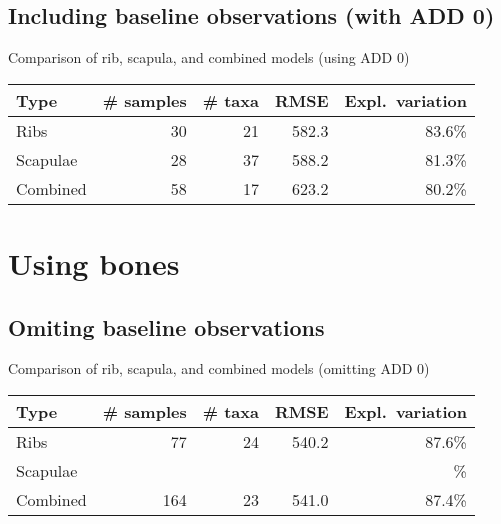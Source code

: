 \documentclass{beamer}
\begin{document}



\subsection{Including baseline observations (with ADD 0)}

\begin{frame}{Comparison of rib, scapula, and combined models (using ADD 0)}

  \begin{tabular}{lrrrr}
    Type & \# samples & \# taxa & RMSE & Expl.\ variation\\ \hline
    Ribs & 30 & 21 & 582.3 & 83.6\% \\
    Scapulae & 28 & 37 & 588.2 & 81.3\% \\
    Combined & 58 & 17 & 623.2 & 80.2\%
  \end{tabular}

\end{frame}








\section{Using bones}


\subsection{Omiting baseline observations}

\begin{frame}{Comparison of rib, scapula, and combined models (omitting ADD 0)}

  \begin{tabular}{lrrrr}
    Type & \# samples & \# taxa & RMSE & Expl.\ variation\\ \hline
    Ribs & 77 & 24 & 540.2 & 87.6\% \\
    Scapulae & &  &  &  \% \\
    Combined & 164 & 23 & 541.0 & 87.4\%
  \end{tabular}

  \vspace{0.2in}



\end{frame}
\end{document}
